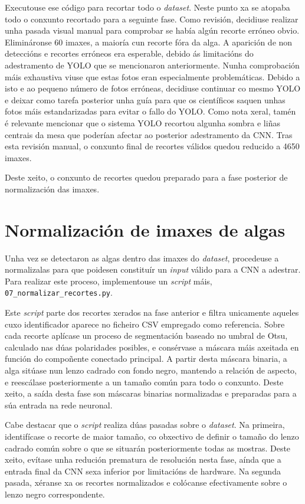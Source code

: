 Executouse ese código para recortar todo o \textit{dataset}. Neste punto xa se atopaba todo o
conxunto recortado para a seguinte fase. Como revisión,
decidiuse realizar unha pasada visual manual para comprobar se había algún recorte erróneo obvio.
Elimináronse 60 imaxes, a maioría cun recorte fóra da alga. A aparición de non deteccións e recortes erróneos era esperable, debido
ás limitacións do adestramento de YOLO que se
mencionaron anteriormente. Nunha comprobación máis exhaustiva viuse que estas fotos eran
especialmente problemáticas. Debido a isto e ao pequeno número de fotos erróneas, decidiuse
continuar co mesmo YOLO e deixar como tarefa posterior unha guía para que os científicos saquen
unhas fotos máis estandarizadas para evitar o fallo do YOLO. Como nota xeral, tamén é relevante
mencionar que o sistema YOLO recortou algunha sombra e liñas centrais da mesa que poderían afectar
ao posterior adestramento da CNN. Tras esta revisión manual, o conxunto final de recortes válidos quedou
reducido a 4650 imaxes.

Deste xeito, o conxunto de recortes quedou preparado para a fase posterior de normalización das
imaxes.

\section{Normalización de imaxes de algas}
Unha vez se detectaron as algas dentro das imaxes do \textit{dataset}, procedeuse a normalizalas para que
poidesen constituír un \textit{input} válido para a CNN a adestrar. Para realizar este proceso,
implementouse un \textit{script} máis, \texttt{07\_normalizar\_recortes.py}.

Este \textit{script} parte dos recortes xerados na fase anterior e filtra unicamente aqueles cuxo
identificador aparece no ficheiro CSV empregado como referencia. Sobre cada recorte aplícase un
proceso de segmentación baseado no umbral de Otsu, calculado nas dúas polaridades posibles, e
consérvase a máscara máis axeitada en función do compoñente conectado principal. A partir desta
máscara binaria, a alga sitúase nun lenzo cadrado con fondo negro, mantendo a relación de aspecto,
e reescálase posteriormente a un tamaño común para todo o conxunto. Deste xeito, a saída desta fase
son máscaras binarias normalizadas e preparadas para a súa entrada na rede neuronal.

Cabe destacar que o \textit{script} realiza dúas pasadas sobre o \textit{dataset}. Na primeira,
identifícase o recorte de maior tamaño, co obxectivo de definir o tamaño do lenzo cadrado común
sobre o que se situarán posteriormente todas as mostras. Deste xeito, evítase unha redución
prematura de resolución nesta fase, aínda que a entrada final da CNN sexa inferior por limitacións
de hardware. Na segunda pasada, xéranse xa os recortes normalizados e colócanse efectivamente sobre
o lenzo negro correspondente.

